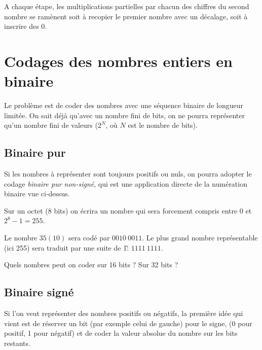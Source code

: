 A chaque \'etape, les multiplications partielles par chacun des
chiffres du second nombre se ram\`enent
soit \`a recopier le premier nombre avec un d\'ecalage,  soit \`a inscrire des 0.

%

\section{Codages des nombres entiers en binaire}

Le probl\`eme est de coder des nombres avec une s\'equence binaire de
longueur limit\'ee.  On sait d\'ej\`a qu'avec un nombre fini de bits,
on ne pourra repr\'esenter qu'un nombre fini de valeurs ($2^N$, o\`u
$N$ est le nombre de bits).

\subsection{Binaire pur}

Si les nombres \`a repr\'esenter sont toujours positifs ou nuls, on pourra
adopter le codage {\em binaire pur non-sign\'e}, qui est une application
directe de la num\'eration binaire vue ci-dessus.  

Sur un octet (8 bits) on \'ecrira
un nombre qui sera forcement compris entre 0 et $2^8-1 =  255$. 

\begin{exemple}{} Le nombre 
$35 (10)$ sera cod\'e par $0010\ 0011$. Le plus grand nombre repr\'esentable
(ici 255) sera traduit par une suite de 1\~: $1111\ 1111$.
\end{exemple}

\begin{exercice}{} Quels nombres peut on coder sur 16 bits ? Sur 32 bits ?
\end{exercice}

\subsection{Binaire sign\'e}

Si l'on veut repr\'esenter des nombres positifs ou n\'egatifs, la premi\`ere id\'ee
qui vient est de r\'eserver un bit (par exemple celui de gauche) pour le signe,
(0 pour positif, 1 pour n\'egatif)
et de coder la valeur absolue du nombre sur les bits restants.

